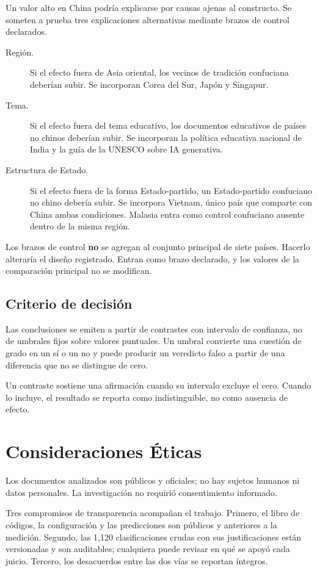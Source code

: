 Un valor alto en China podría explicarse por causas ajenas al constructo. Se someten a prueba tres explicaciones alternativas mediante brazos de control declarados.

\begin{description}
    \item[Región.] Si el efecto fuera de Asia oriental, los vecinos de tradición confuciana deberían subir. Se incorporan Corea del Sur, Japón y Singapur.
    \item[Tema.] Si el efecto fuera del tema educativo, los documentos educativos de países no chinos deberían subir. Se incorporan la política educativa nacional de India y la guía de la UNESCO sobre IA generativa.
    \item[Estructura de Estado.] Si el efecto fuera de la forma Estado-partido, un Estado-partido confuciano no chino debería subir. Se incorpora Vietnam, único país que comparte con China ambas condiciones. Malasia entra como control confuciano ausente dentro de la misma región.
\end{description}

Los brazos de control \textbf{no} se agregan al conjunto principal de siete países. Hacerlo alteraría el diseño registrado. Entran como brazo declarado, y los valores de la comparación principal no se modifican.

\subsection{Criterio de decisión}

Las conclusiones se emiten a partir de contrastes con intervalo de confianza, no de umbrales fijos sobre valores puntuales. Un umbral convierte una cuestión de grado en un sí o un no y puede producir un veredicto falso a partir de una diferencia que no se distingue de cero.

Un contraste sostiene una afirmación cuando su intervalo excluye el cero. Cuando lo incluye, el resultado se reporta como indistinguible, no como ausencia de efecto.

\section{Consideraciones Éticas}

Los documentos analizados son públicos y oficiales; no hay sujetos humanos ni datos personales. La investigación no requirió consentimiento informado.

Tres compromisos de transparencia acompañan el trabajo. Primero, el libro de códigos, la configuración y las predicciones son públicos y anteriores a la medición. Segundo, las 1{,}120 clasificaciones crudas con sus justificaciones están versionadas y son auditables; cualquiera puede revisar en qué se apoyó cada juicio. Tercero, los desacuerdos entre las dos vías se reportan íntegros.

